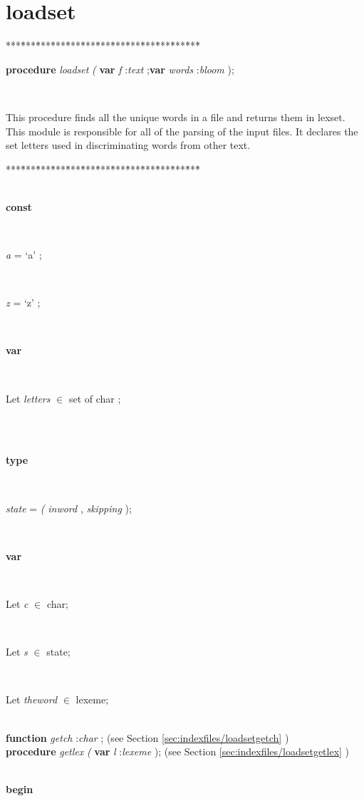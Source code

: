 \documentclass[10pt, a4paper]{article}
\begin{document}
\section{loadset}\label{sec:indexfilesloadset}

\begin{tabbing}
***\=***\=***\=***\=***\=***\=***\=***\=***\=***\=***\=***\=***\=\kill
\parbox{14cm}{\textsf{\textbf{procedure}  \textit{loadset} \textit{(} \textbf{var}  \textit{f} :\textit{text} ;\textbf{var}  \textit{words} :\textit{bloom} );}}\\
\end{tabbing}
This procedure finds all the unique words in a file
and returns them in lexset.
This module is responsible for all of the parsing of
the input files.
It declares the set \textsf{letters} used in discriminating words
from other text.
\begin{tabbing}
***\=***\=***\=***\=***\=***\=***\=***\=***\=***\=***\=***\=***\=\kill
\\
\\
\+\parbox{14cm}{\textsf{\textbf{const} }}\\
\parbox{14cm}{\textsf{\textit{a} =\textrm{\textup { `a' } };}}\\
\parbox{14cm}{\textsf{\textit{z} =\textrm{\textup { `z' } };}}\\
\<\parbox{14cm}{\textsf{\textbf{var} }}\\
\parbox{14cm}{\textsf{Let \textit{letters} $\in$ set of char ;}}\\
\\
\<\parbox{14cm}{\textsf{\textbf{type} }}\\
\parbox{14cm}{\textsf{\textit{state}  = \textit{(} \textit{inword} , \textit{skipping} );}}\\
\<\parbox{14cm}{\textsf{\textbf{var} }}\\
\parbox{14cm}{\textsf{Let \textit{c} $\in$  char;}}\\
\parbox{14cm}{\textsf{Let \textit{s} $\in$  state;}}\\
\parbox{14cm}{\textsf{Let \textit{theword} $\in$ lexeme;}}\\
\<\textsf{\textbf{function}  \textit{getch} :\textit{char} ;} (see Section \ref{sec:indexfiles/loadsetgetch} )\\
\<\textsf{\textbf{procedure}  \textit{getlex} \textit{(} \textbf{var}  \textit{l} :\textit{lexeme} );} (see Section \ref{sec:indexfiles/loadsetgetlex} )\\
\\
\-\<\+\parbox{14cm}{\textsf{\textbf{begin} }}\\

\end{tabbing}
\end{document}
